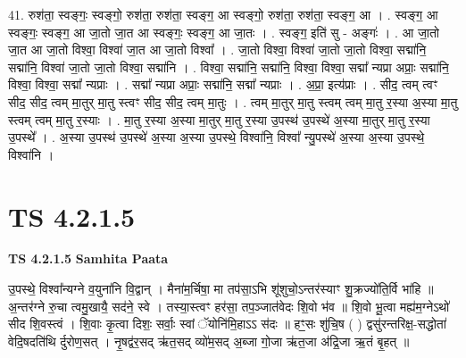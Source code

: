 \documentclass[17pt]{extarticle}
\begin{document}
41. रुश॑ता॒ स्वङ्गः॒ स्वङ्गो॒ रुश॑ता॒ रुश॑ता॒ स्वङ्ग॒ आ स्वङ्गो॒ रुश॑ता॒ रुश॑ता॒ स्वङ्ग॒ आ । . स्वङ्ग॒ आ स्वङ्गः॒ स्वङ्ग॒ आ जा॒तो जा॒त आ स्वङ्गः॒ स्वङ्ग॒ आ जा॒तः । . स्वङ्ग॒ इति॑ सु - अङ्गः॑ । . आ जा॒तो जा॒त आ जा॒तो विश्वा॒ विश्वा॑ जा॒त आ जा॒तो विश्वा᳚ । . जा॒तो विश्वा॒ विश्वा॑ जा॒तो जा॒तो विश्वा॒ सद्मा॑नि॒ सद्मा॑नि॒ विश्वा॑ जा॒तो जा॒तो विश्वा॒ सद्मा॑नि । . विश्वा॒ सद्मा॑नि॒ सद्मा॑नि॒ विश्वा॒ विश्वा॒ सद्मा᳚ न्यप्रा अप्राः॒ सद्मा॑नि॒ विश्वा॒ विश्वा॒ सद्मा᳚ न्यप्राः । . सद्मा᳚ न्यप्रा अप्राः॒ सद्मा॑नि॒ सद्मा᳚ न्यप्राः । . अ॒प्रा॒ इत्य॑प्राः । . सीद॒ त्वम् त्वꣳ सीद॒ सीद॒ त्वम् मा॒तुर् मा॒तु स्त्वꣳ सीद॒ सीद॒ त्वम् मा॒तुः । . त्वम् मा॒तुर् मा॒तु स्त्वम् त्वम् मा॒तु र॒स्या अ॒स्या मा॒तु स्त्वम् त्वम् मा॒तु र॒स्याः । . मा॒तु र॒स्या अ॒स्या मा॒तुर् मा॒तु र॒स्या उ॒पस्थ॑ उ॒पस्थे॑ अ॒स्या मा॒तुर् मा॒तु र॒स्या उ॒पस्थे᳚ । . अ॒स्या उ॒पस्थ॑ उ॒पस्थे॑ अ॒स्या अ॒स्या उ॒पस्थे॒ विश्वा॑नि॒ विश्वा᳚ न्यु॒पस्थे॑ अ॒स्या अ॒स्या उ॒पस्थे॒ विश्वा॑नि । \newline
\pagebreak
{}

\section{ TS 4.2.1.5 }

\textbf{TS 4.2.1.5 } \newline
\textbf{Samhita Paata} \newline

उ॒पस्थे॒ विश्वा᳚न्यग्ने व॒युना॑नि वि॒द्वान् । मैना॑म॒र्चिषा॒ मा तप॑सा॒ऽभि शू॑शुचो॒ऽन्तर॑स्याꣳ शु॒क्रज्यो॑ति॒र्वि भा॑हि ॥ अ॒न्तर॑ग्ने रु॒चा त्वमु॒खायै॒ सद॑ने॒ स्वे । तस्या॒स्त्वꣳ हर॑सा॒ तप॒ञ्जात॑वेदः शि॒वो भ॑व ॥ शि॒वो भू॒त्वा मह्य॑म॒ग्नेऽथो॑ सीद शि॒वस्त्वं । शि॒वाः कृ॒त्वा दिशः॒ सर्वाः॒ स्वां ॅयोनि॑मि॒हाऽऽ स॑दः ॥ हꣳ॒॒सः शु॑चि॒ष ( ) द्वसु॑रन्तरिक्ष॒-सद्धोता॑ वेदि॒षदति॑थि र्दुरोण॒सत् । नृ॒षद्व॑र॒सद् ऋ॑त॒सद् व्यो॑म॒सद् अ॒ब्जा गो॒जा ऋ॑त॒जा अ॑द्रि॒जा ऋ॒तं बृ॒हत् ॥ \newline
\end{document}

